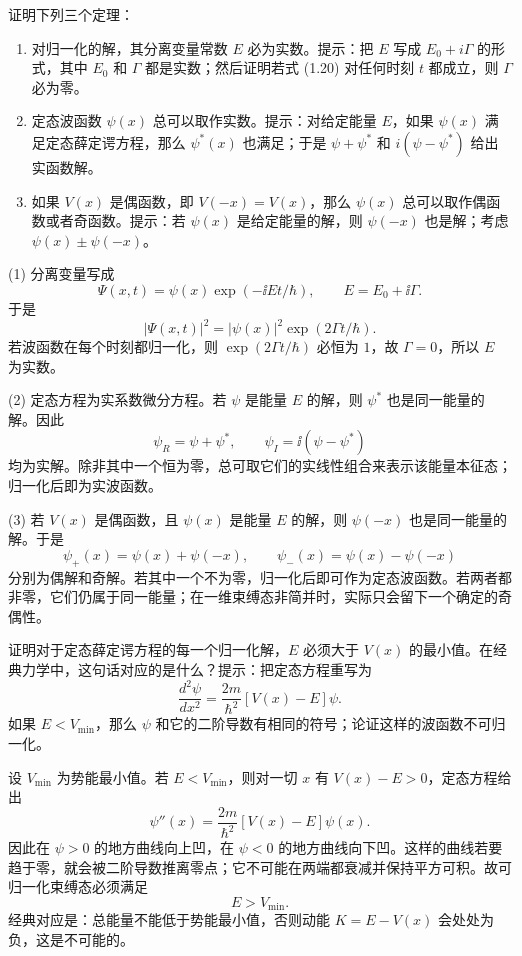 \begin{question}
证明下列三个定理：
\begin{enumerate}
\item 对归一化的解，其分离变量常数 $E$ 必为实数。提示：把 $E$ 写成 $E_0+i\Gamma$ 的形式，其中 $E_0$ 和 $\Gamma$ 都是实数；然后证明若式 (1.20) 对任何时刻 $t$ 都成立，则 $\Gamma$ 必为零。
\item 定态波函数 $\psi(x)$ 总可以取作实数。提示：对给定能量 $E$，如果 $\psi(x)$ 满足定态薛定谔方程，那么 $\psi^*(x)$ 也满足；于是 $\psi+\psi^*$ 和 $i(\psi-\psi^*)$ 给出实函数解。
\item 如果 $V(x)$ 是偶函数，即 $V(-x)=V(x)$，那么 $\psi(x)$ 总可以取作偶函数或者奇函数。提示：若 $\psi(x)$ 是给定能量的解，则 $\psi(-x)$ 也是解；考虑 $\psi(x)\pm\psi(-x)$。
\end{enumerate}

\par\smallskip
{}

\end{question}
\begin{solution}
(1) 分离变量写成
\[
\Psi(x,t)=\psi(x)\exp(-\ii Et/\hbar),\qquad E=E_0+\ii\Gamma .
\]
于是
\[
|\Psi(x,t)|^2=|\psi(x)|^2\exp(2\Gamma t/\hbar).
\]
若波函数在每个时刻都归一化，则 $\exp(2\Gamma t/\hbar)$ 必恒为 $1$，故 $\Gamma=0$，所以 $E$ 为实数。

(2) 定态方程为实系数微分方程。若 $\psi$ 是能量 $E$ 的解，则 $\psi^*$ 也是同一能量的解。因此
\[
\psi_R=\psi+\psi^*,\qquad \psi_I=\ii(\psi-\psi^*)
\]
均为实解。除非其中一个恒为零，总可取它们的实线性组合来表示该能量本征态；归一化后即为实波函数。

(3) 若 $V(x)$ 是偶函数，且 $\psi(x)$ 是能量 $E$ 的解，则 $\psi(-x)$ 也是同一能量的解。于是
\[
\psi_+(x)=\psi(x)+\psi(-x),\qquad \psi_-(x)=\psi(x)-\psi(-x)
\]
分别为偶解和奇解。若其中一个不为零，归一化后即可作为定态波函数。若两者都非零，它们仍属于同一能量；在一维束缚态非简并时，实际只会留下一个确定的奇偶性。
\end{solution}

\begin{question}
证明对于定态薛定谔方程的每一个归一化解，$E$ 必须大于 $V(x)$ 的最小值。在经典力学中，这句话对应的是什么？提示：把定态方程重写为
\[
\frac{d^2\psi}{dx^2}=\frac{2m}{\hbar^2}[V(x)-E]\psi .
\]
如果 $E<V_{\min}$，那么 $\psi$ 和它的二阶导数有相同的符号；论证这样的波函数不可归一化。
\end{question}
\begin{solution}
设 $V_{\min}$ 为势能最小值。若 $E<V_{\min}$，则对一切 $x$ 有 $V(x)-E>0$，定态方程给出
\[
\psi''(x)=\frac{2m}{\hbar^2}[V(x)-E]\psi(x).
\]
因此在 $\psi>0$ 的地方曲线向上凹，在 $\psi<0$ 的地方曲线向下凹。这样的曲线若要趋于零，就会被二阶导数推离零点；它不可能在两端都衰减并保持平方可积。故可归一化束缚态必须满足
\[
E>V_{\min}.
\]
经典对应是：总能量不能低于势能最小值，否则动能 $K=E-V(x)$ 会处处为负，这是不可能的。
\end{solution}

